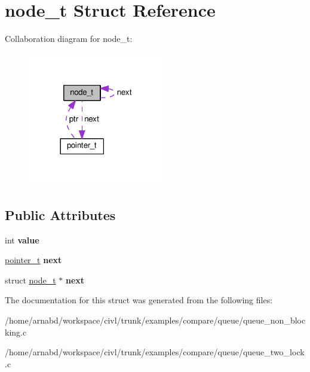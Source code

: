 \hypertarget{structnode__t}{}\section{node\+\_\+t Struct Reference}
\label{structnode__t}


Collaboration diagram for node\+\_\+t\+:
\nopagebreak
\begin{figure}[H]
\begin{center}
\leavevmode
\includegraphics[width=170pt]{structnode__t__coll__graph}
\end{center}
\end{figure}
\subsection*{Public Attributes}
\begin{DoxyCompactItemize}
\item 
\hypertarget{structnode__t_ad1acde31d5d44e4418fbd04049f75cbf}{}int {\bfseries value}\label{structnode__t_ad1acde31d5d44e4418fbd04049f75cbf}

\item 
\hypertarget{structnode__t_a65b3f278007386daf6028624f0330d9e}{}\hyperlink{structpointer__t}{pointer\+\_\+t} {\bfseries next}\label{structnode__t_a65b3f278007386daf6028624f0330d9e}

\item 
\hypertarget{structnode__t_aca548c9bafe54ba9db19d40a7a7f1cb3}{}struct \hyperlink{structnode__t}{node\+\_\+t} $\ast$ {\bfseries next}\label{structnode__t_aca548c9bafe54ba9db19d40a7a7f1cb3}

\end{DoxyCompactItemize}


The documentation for this struct was generated from the following files\+:\begin{DoxyCompactItemize}
\item 
/home/arnabd/workspace/civl/trunk/examples/compare/queue/queue\+\_\+non\+\_\+blocking.\+c\item 
/home/arnabd/workspace/civl/trunk/examples/compare/queue/queue\+\_\+two\+\_\+lock.\+c\end{DoxyCompactItemize}
